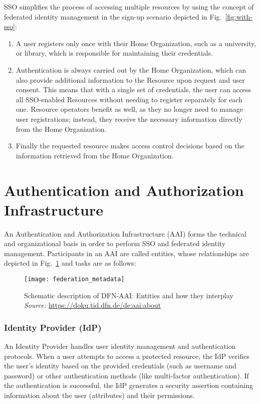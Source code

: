 SSO simplifies the process of accessing multiple resources by using the concept
of federated identity management in the sign-up scenario depicted in
Fig.~\ref{fig:with-sso}:
 
\begin{enumerate}
\item A user registers only once with their Home Organization, such as a
university, or library, which is responsible for maintaining their credentials.

\item Authentication is always carried out by the Home Organization, which can
also provide additional information to the Resource upon request and user
consent. This means that with a single set of credentials, the user can access
all SSO-enabled Resources without needing to register separately for each one.
Resource operators benefit as well, as they no longer need to manage user
registrations; instead, they receive the necessary information directly from the
Home Organization. 

\item Finally the requested resource makes access control decisions based on the
information retrieved from the Home Organization.
\end{enumerate}

\section{Authentication and Authorization Infrastructure}

An Authentication and Authorization Infrastructure (AAI) forms the technical and
organizational basis in order to perform SSO and federated identity management.
Participants in an AAI are called entities, whose relationships are depicted in
Fig.~\ref{fig:federation} and tasks are as follows:

\begin{figure}[htb]
    \centering
    \texttt{[image: federation\_metadata]}
    \caption{Schematic description of DFN-AAI: Entities and how they interplay
    \\ \textit{Source:} \url{https://doku.tid.dfn.de/de:aai:about}}
    \label{fig:federation}
  \end{figure}

\subsubsection*{Identity Provider (IdP)}
An Identity Provider handles user identity management and authentication
protocols. When a user attempts to access a protected resource, the IdP verifies
the user's identity based on the provided credentials (such as username and
password) or other authentication methods (like multi-factor authentication). If
the authentication is successful, the IdP generates a security assertion
containing information about the user (attributes) and their permissions.

